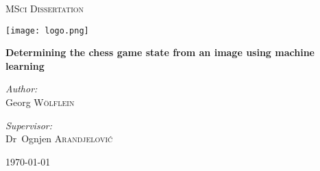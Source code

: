 \begin{titlepage}
	\centering
	
	{\scshape\LARGE MSci Dissertation\par}
	\vspace{0.25cm}
	{\texttt{[image: logo.png]} \par}
	\vspace{0.25cm}
	{\huge\bfseries Determining the chess game state from an image using machine learning\par}
	\vspace{0.5cm}

	\vfill

	\noindent
	\begin{minipage}{0.45\textwidth}
		\begin{center} \large
		  \textit{Author:}\\
          Georg \textsc{Wölflein}\\
		\end{center}
    \end{minipage}%
    \begin{minipage}{0.45\textwidth}
		\begin{center} \large
		\textit{Supervisor:} \\
		Dr~Ognjen \textsc{Arandjelović}
		\end{center}
	\end{minipage}%

	\vfill

	{\today\par}
\end{titlepage}
